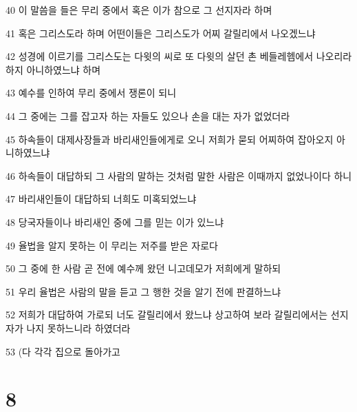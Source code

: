 \par 40 이 말씀을 들은 무리 중에서 혹은 이가 참으로 그 선지자라 하며
\par 41 혹은 그리스도라 하며 어떤이들은 그리스도가 어찌 갈릴리에서 나오겠느냐
\par 42 성경에 이르기를 그리스도는 다윗의 씨로 또 다윗의 살던 촌 베들레헴에서 나오리라 하지 아니하였느냐 하며
\par 43 예수를 인하여 무리 중에서 쟁론이 되니
\par 44 그 중에는 그를 잡고자 하는 자들도 있으나 손을 대는 자가 없었더라
\par 45 하속들이 대제사장들과 바리새인들에게로 오니 저희가 묻되 어찌하여 잡아오지 아니하였느냐
\par 46 하속들이 대답하되 그 사람의 말하는 것처럼 말한 사람은 이때까지 없었나이다 하니
\par 47 바리새인들이 대답하되 너희도 미혹되었느냐
\par 48 당국자들이나 바리새인 중에 그를 믿는 이가 있느냐
\par 49 율법을 알지 못하는 이 무리는 저주를 받은 자로다
\par 50 그 중에 한 사람 곧 전에 예수께 왔던 니고데모가 저희에게 말하되
\par 51 우리 율법은 사람의 말을 듣고 그 행한 것을 알기 전에 판결하느냐
\par 52 저희가 대답하여 가로되 너도 갈릴리에서 왔느냐 상고하여 보라 갈릴리에서는 선지자가 나지 못하느니라 하였더라
\par 53 (다 각각 집으로 돌아가고

\chapter{8}


